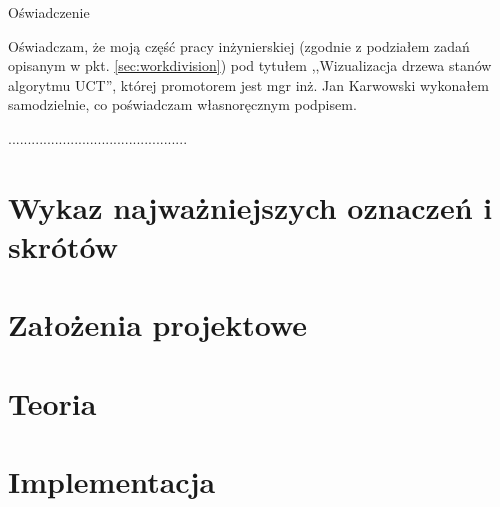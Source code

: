 \documentclass[a4paper,11pt,twoside]{report}
\theoremstyle{definition}
\newcommand{\tytul}{Wizualizacja drzewa stanów algorytmu UCT}
\newcommand{\supervisor}{mgr inż. Jan Karwowski }
\begin{document}
\begin{center}
Oświadczenie
\end{center}

\indent Oświadczam, że moją część pracy inżynierskiej (zgodnie z podziałem zadań opisanym w pkt. \ref{sec:workdivision}) pod tytułem ,,\tytul '', której promotorem jest \supervisor wykonałem samodzielnie, co poświadczam własnoręcznym podpisem.
\vspace{2cm}

\begin{flushright}
  \begin{minipage}{50mm}
    \begin{center}
      ..............................................

    \end{center}
  \end{minipage}
\end{flushright}

\thispagestyle{empty}
\newpage

\null\thispagestyle{empty}\newpage


\tableofcontents
\thispagestyle{empty}

\newpage %

\null\thispagestyle{empty}\newpage
\pagestyle{fancy}
\setcounter{page}{11} %

\chapter*{Wykaz najważniejszych oznaczeń i skrótów}


\chapter{Założenia projektowe}


\chapter{Teoria}


\chapter{Implementacja}

\end{document}

